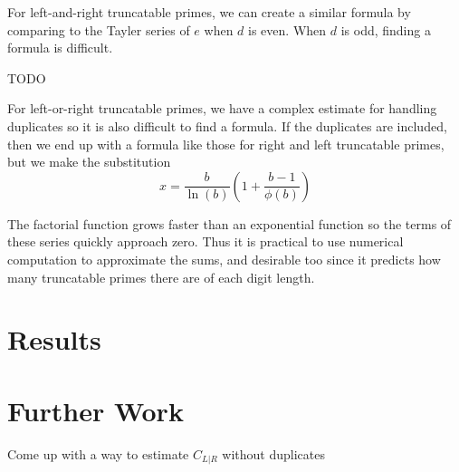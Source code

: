 \documentclass[12pt]{article}
\begin{document}
For left-and-right truncatable primes, we can create a similar formula by comparing to the Tayler series of $e$ when $d$ is even. When $d$ is odd, finding a formula is difficult.

TODO

For left-or-right truncatable primes, we have a complex estimate for handling duplicates so it is also difficult to find a formula. If the duplicates are included, then we end up with a formula like those for right and left truncatable primes, but we make the substitution
\begin{equation}
x = \frac{b}{\ln(b)} \left( 1+\frac{b-1}{\phi(b)} \right)
\end{equation}

The factorial function grows faster than an exponential function so the terms of these series quickly approach zero. Thus it is practical to use numerical computation to approximate the sums, and desirable too since it predicts how many truncatable primes there are of each digit length.

\section{Results}

\section{Further Work}

Come up with a way to estimate $C_{L|R}$ without duplicates

\cite{PARI2} \cite{OEIS}

\printbibliography[title={References}]
\end{document}
